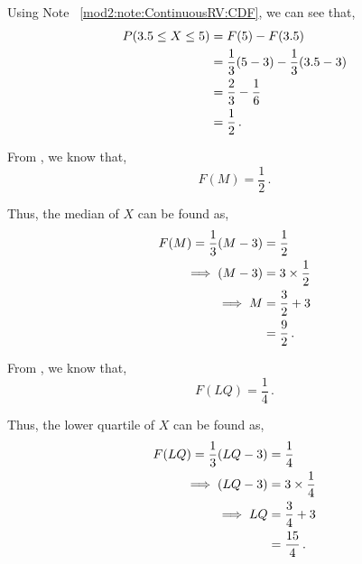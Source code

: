 \begin{subquestions}
\begin{subsubquestions}
Using Note ~\ref{mod2:note:ContinuousRV:CDF}, we can see that,
\begin{align}
	P(3.5 \leq X \leq 5) & = F(5) - F(3.5) \nonumber \\
	                     & = \frac{1}{3}(5-3) - \frac{1}{3}(3.5-3) \nonumber \\
	                     & = \frac{2}{3} - \frac{1}{6} \nonumber \\
	                     & = \frac{1}{2} \,.
\end{align}


\subsubquestion

From , we know that,
\begin{equation}
	F(M) = \frac{1}{2} \,.
\end{equation}

Thus, the median of $X$ can be found as,
\begin{align}
	F(M) = \frac{1}{3}(M-3) & = \frac{1}{2} \nonumber \\
	       \implies (M-3) & = 3 \times \frac{1}{2} \nonumber \\
	       \implies M & = \frac{3}{2} + 3 \nonumber \\
	                  & = \frac{9}{2} \,.
\end{align}


\subsubquestion

From , we know that,
\begin{equation}
	F(LQ) = \frac{1}{4} \,.
\end{equation}

Thus, the lower quartile of $X$ can be found as,
\begin{align}
	F(LQ) = \frac{1}{3}(LQ-3) & = \frac{1}{4} \nonumber \\
			 \implies (LQ-3) & = 3 \times \frac{1}{4} \nonumber \\
			     \implies LQ & = \frac{3}{4} + 3 \nonumber \\
				      	     & = \frac{15}{4} \,.
\end{align}

\end{subsubquestions}

	

\end{subquestions}
